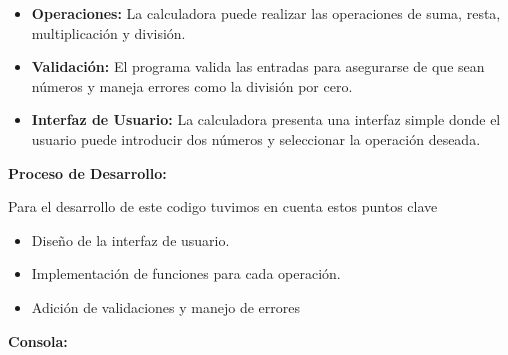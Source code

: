 \documentclass[a4paper]{article}
\newcommand\textstyleListLabelxiv[1]{\textrm{\textbf{#1}}}
\begin{document}
\begin{itemize}[resume*=listWWNumii]
\item {
\textbf{Operaciones:} La calculadora puede realizar las operaciones de suma, resta, multiplicación y división.}
\item {
\textbf{Validación:} El programa valida las entradas para asegurarse de que sean números y maneja errores como la
división por cero.}
\item {
\textbf{Interfaz de Usuario:} La calculadora presenta una interfaz simple donde el usuario puede introducir dos números
y seleccionar la operación deseada.}
\end{itemize}
{
\textbf{Proceso de Desarrollo:}}


\bigskip

{
Para el desarrollo de este codigo tuvimos en cuenta estos puntos clave}

\begin{itemize}[series=listWWNumiii,label=\textstyleListLabelxiv{{}-}]
\item {
Diseño de la interfaz de usuario.}
\item {
Implementación de funciones para cada operación.}
\item {
Adición de validaciones y manejo de errores}
\end{itemize}
{
\textbf{Consola:}}



\begin{center}
\end{center}
\begin{center}
\end{center}

\bigskip


\bigskip


\bigskip


\bigskip


\bigskip
\end{document}
